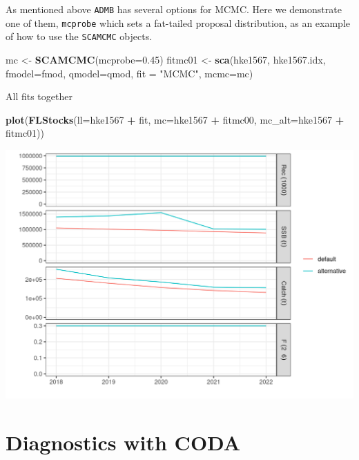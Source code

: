 \documentclass[
]{book}
\newenvironment{Shaded}{\begin{snugshade}}{\end{snugshade}}
\newcommand{\AttributeTok}[1]{\textcolor[rgb]{0.13,0.29,0.53}{#1}}
\newcommand{\FloatTok}[1]{\textcolor[rgb]{0.00,0.00,0.81}{#1}}
\newcommand{\FunctionTok}[1]{\textcolor[rgb]{0.13,0.29,0.53}{\textbf{#1}}}
\newcommand{\NormalTok}[1]{#1}
\newcommand{\OtherTok}[1]{\textcolor[rgb]{0.56,0.35,0.01}{#1}}
\newcommand{\SpecialCharTok}[1]{\textcolor[rgb]{0.81,0.36,0.00}{\textbf{#1}}}
\newcommand{\StringTok}[1]{\textcolor[rgb]{0.31,0.60,0.02}{#1}}
\begin{document}
As mentioned above \texttt{ADMB} has several options for MCMC. Here we demonstrate one of them, \texttt{mcprobe} which sets a fat-tailed proposal distribution, as an example of how to use the \texttt{SCAMCMC} objects.

\begin{Shaded}
\begin{Highlighting}[]
\NormalTok{mc }\OtherTok{\textless{}{-}} \FunctionTok{SCAMCMC}\NormalTok{(}\AttributeTok{mcprobe=}\FloatTok{0.45}\NormalTok{)}
\NormalTok{fitmc01 }\OtherTok{\textless{}{-}} \FunctionTok{sca}\NormalTok{(hke1567, hke1567.idx, }\AttributeTok{fmodel=}\NormalTok{fmod, }\AttributeTok{qmodel=}\NormalTok{qmod, }\AttributeTok{fit =} \StringTok{"MCMC"}\NormalTok{, }\AttributeTok{mcmc=}\NormalTok{mc)}
\end{Highlighting}
\end{Shaded}

All fits together

\begin{Shaded}
\begin{Highlighting}[]
\FunctionTok{plot}\NormalTok{(}\FunctionTok{FLStocks}\NormalTok{(}\AttributeTok{ll=}\NormalTok{hke1567 }\SpecialCharTok{+}\NormalTok{ fit, }\AttributeTok{mc=}\NormalTok{hke1567 }\SpecialCharTok{+}\NormalTok{ fitmc00, }\AttributeTok{mc\_alt=}\NormalTok{hke1567 }\SpecialCharTok{+}\NormalTok{ fitmc01))}
\end{Highlighting}
\end{Shaded}

\includegraphics{_bookdown_files/_main_files/figure-html/unnamed-chunk-121-1.png}

\hypertarget{diagnostics-with-coda}{%
\section{Diagnostics with CODA}\label{diagnostics-with-coda}}
\end{document}
